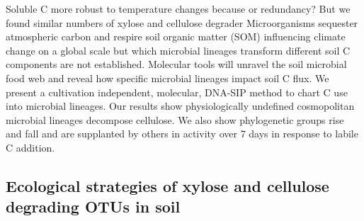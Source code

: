 Soluble C more robust to temperature changes because or redundancy? But we
found similar numbers of xylose and cellulose degrader
Microorganisms sequester atmospheric carbon and respire soil organic matter
(SOM) influencing climate change on a global scale but which microbial lineages
transform different soil C components are not established. Molecular tools will
unravel the soil microbial food web and reveal how specific microbial lineages
impact soil C flux. We present a cultivation independent, molecular, DNA-SIP
method to chart C use into microbial lineages. Our results show physiologically
undefined cosmopolitan microbial lineages decompose cellulose. We also show
phylogenetic groups rise and fall and are supplanted by others in activity over
7 days in response to labile C addition.  
\subsection{Ecological strategies of xylose and cellulose degrading OTUs in
    soil}
